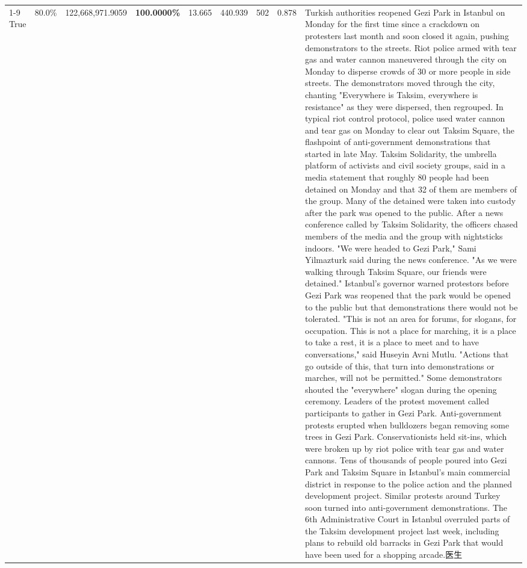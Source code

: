 \begin{table}[H]
\begin{tabular}{lllrlllll}
\cline{1-9}
True & 80.0\% & 122,668,971.9059 & \bfseries \color{red} 100.0000\% & 13.665 & 440.939 & 502 & 0.878 & Turkish authorities reopened Gezi Park in Istanbul on Monday for the first time since a crackdown on protesters last month and soon closed it again, pushing demonstrators to the streets. Riot police armed with tear gas and water cannon maneuvered through the city on Monday to disperse crowds of 30 or more people in side streets. The demonstrators moved through the city, chanting "Everywhere is Taksim, everywhere is resistance" as they were dispersed, then regrouped. In typical riot control protocol, police used water cannon and tear gas on Monday to clear out Taksim Square, the flashpoint of anti-government demonstrations that started in late May. Taksim Solidarity, the umbrella platform of activists and civil society groups, said in a media statement that roughly 80 people had been detained on Monday and that 32 of them are members of the group. Many of the detained were taken into custody after the park was opened to the public. After a news conference called by Taksim Solidarity, the officers chased members of the media and the group with nightsticks indoors. "We were headed to Gezi Park," Sami Yilmazturk said during the news conference. "As we were walking through Taksim Square, our friends were detained." Istanbul's governor warned protestors before Gezi Park was reopened that the park would be opened to the public but that demonstrations there would not be tolerated. "This is not an area for forums, for slogans, for occupation. This is not a place for marching, it is a place to take a rest, it is a place to meet and to have conversations," said Huseyin Avni Mutlu. "Actions that go outside of this, that turn into demonstrations or marches, will not be permitted." Some demonstrators shouted the "everywhere" slogan during the opening ceremony. Leaders of the protest movement called participants to gather in Gezi Park. Anti-government protests erupted when bulldozers began removing some trees in Gezi Park. Conservationists held sit-ins, which were broken up by riot police with tear gas and water cannons. Tens of thousands of people poured into Gezi Park and Taksim Square in Istanbul's main commercial district in response to the police action and the planned development project. Similar protests around Turkey soon turned into anti-government demonstrations. The 6th Administrative Court in Istanbul overruled parts of the Taksim development project last week, including plans to rebuild old barracks in Gezi Park that would have been used for a shopping arcade.医生 \\

\end{tabular}
\end{table}

